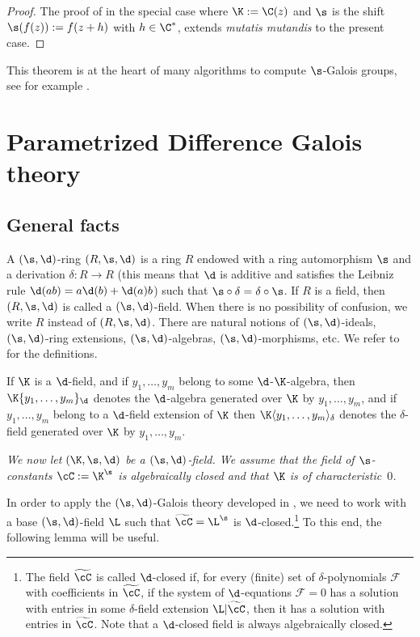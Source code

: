 \begin{proof}
The proof of \cite[ Props.\,1.20 \& 1.21]{VdPS97} in the special case where $\K:=\C(z)$ and $\s$ is the shift $\s(f(z)):=f(z+h)$ with $h \in \C^*$, extends \emph{mutatis mutandis} to the present case.
\end{proof}

This theorem is at the heart of many algorithms to compute $\s$-Galois groups, see for example \cite{Hen97,Hen98,dreyfus2015galois,roques2018algebraic}.\enlargethispage{.5\baselineskip}%

\section{Parametrized Difference Galois theory}\label{sec:parampv}

\subsection{General facts}
A $(\s, \d)$-ring $(R,\s,\d)$ is a ring $R$ endowed with a ring automorphism $\s$ and a derivation $\delta : R \to R$ (this means that $\d$ is additive and satisfies the Leibniz rule $\d(ab)=a\d(b)+\d(a)b$) such that $\s \circ \delta= \delta \circ \s$.
If $R$ is a field, then $(R,\s,\d)$ is called a $(\s, \d)$-field. When there is no possibility of confusion, we write $R$ instead of $(R,\s, \d)$. There are natural notions of $(\s, \d)$-ideals, $(\s, \d)$-ring extensions, $(\s, \d)$-algebras, $(\s, \d)$-morphisms, etc. We refer to \cite[\S 6.2]{HS} for the definitions.

If $\K$ is a $\d$-field, and if $y_{1},\dots,y_{m}$ belong to some $\d$-$\K$-algebra, then $\K\{y_1,\dots,y_{m}\}_\d$ denotes the $\d$-algebra generated over $\K$ by $y_1,\dots,y_{m}$, and if $y_1,\dots,y_m$ belong to a $\d$-field extension of $\K$ then $\K\langle y_{1},\dots,y_{m}\rangle_{\delta}$ denotes the $\delta$-field generated over $\K$ by $y_{1},\dots,y_{m}$.

\emph{We now let $(\K,\s,\d)$ be a $(\s,\d)$-field. We assume that the field of $\s$-constants $\cC:=\K^{\s}$ is algebraically closed and that $\K$ is of characteristic~$0$.}

In order to apply the $(\s,\d)$-Galois theory developed in \cite{HS}, we need to work with a base $(\s, \d)$-field $\L$ such that $\widetilde{\cC}=\L^{\s}$ is $\d$-closed.\footnote{The field $\widetilde{\cC}$ is called $\d$-closed if, for every (finite) set of $\delta$-polynomials $\mathcal F$ with coefficients in $\widetilde{\cC}$, if the system of $\d$-equations $\mathcal F=0$ has a solution with entries in some $\delta$-field extension $\L|\widetilde{\cC}$, then it has a solution with entries in $\widetilde{\cC}$. Note that a $\d$-closed field is always algebraically closed.} To this end, the following lemma will be useful.

